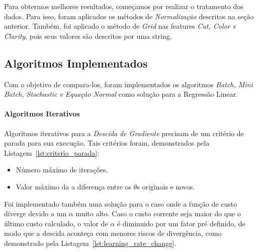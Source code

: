 \documentclass[conference]{IEEEtran}
\newenvironment{filecode}[1][]
{\minipage{0.9\linewidth}%
	\lstset{basicstyle=\ttfamily\footnotesize,frame=single,float=ht,#1}}
{\endminipage}%
\begin{document}
Para obtermos melhores resultados, começamos por realizar o tratamento dos dados. Para isso, foram aplicados os métodos de \textit{Normalização} descritos na seção anterior. Também, foi aplicado o método de \textit{Grid} nas features \textit{Cut, Color e Clarity}, pois seus valores são descritos por uma string.

\subsection{Algoritmos Implementados}

Com o objetivo de compara-los, foram implementados os algoritmos \textit{Batch, Mini Batch, Stochastic e Equação Normal} como solução para a Regressão Linear.

\paragraph{Algoritmos Iterativos}

Algoritmos iterativos para a \textit{Descida de Gradiente} precisam de um critério de parada para sua execução. Tais critérios foram, demonstrados pela Listagem~\ref{lst:criterio_parada}:

\begin{itemize}
  \item Número máximo de iterações.
  \item Valor máximo da a diferença entre os $\theta$s originais e novos.
\end{itemize}

\begin{filecode}[label=lst:criterio_parada,caption=Criterios de Parada para os algoritmos de Descida do Gradiente]
  \lstset{numbers=left}
	
\end{filecode}

Foi implementado também uma solução para o caso onde a função de custo diverge devido a um $\alpha$ muito alto. Caso o custo corrente seja maior do que o último custo calculado, o valor de $\alpha$ é diminuido por um fator pré definido, de modo que a descida aconteça com menores riscos de divergência, como demonstrado pela Listagem~\ref{lst:learning_rate_change}.

\begin{filecode}[label=lst:learning_rate_change,caption=Modo como o fator $\alpha$ é modificado]
  \lstset{numbers=left}
	
\end{filecode}
\end{document}
